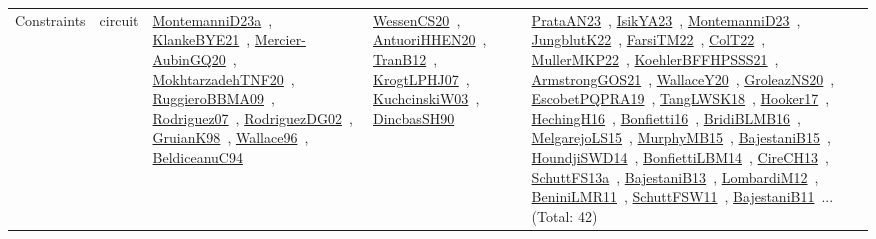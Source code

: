 {\begin{longtable}{lp{3cm}>{\raggedright\arraybackslash}p{6cm}>{\raggedright\arraybackslash}p{6cm}>{\raggedright\arraybackslash}p{8cm}}
Constraints & circuit & \href{works/MontemanniD23a.pdf}{MontemanniD23a}~\cite{MontemanniD23a}, \href{works/KlankeBYE21.pdf}{KlankeBYE21}~\cite{KlankeBYE21}, \href{works/Mercier-AubinGQ20.pdf}{Mercier-AubinGQ20}~\cite{Mercier-AubinGQ20}, \href{works/MokhtarzadehTNF20.pdf}{MokhtarzadehTNF20}~\cite{MokhtarzadehTNF20}, \href{works/RuggieroBBMA09.pdf}{RuggieroBBMA09}~\cite{RuggieroBBMA09}, \href{works/Rodriguez07.pdf}{Rodriguez07}~\cite{Rodriguez07}, \href{works/RodriguezDG02.pdf}{RodriguezDG02}~\cite{RodriguezDG02}, \href{works/GruianK98.pdf}{GruianK98}~\cite{GruianK98}, \href{works/Wallace96.pdf}{Wallace96}~\cite{Wallace96}, \href{works/BeldiceanuC94.pdf}{BeldiceanuC94}~\cite{BeldiceanuC94} & \href{works/WessenCS20.pdf}{WessenCS20}~\cite{WessenCS20}, \href{works/AntuoriHHEN20.pdf}{AntuoriHHEN20}~\cite{AntuoriHHEN20}, \href{works/TranB12.pdf}{TranB12}~\cite{TranB12}, \href{works/KrogtLPHJ07.pdf}{KrogtLPHJ07}~\cite{KrogtLPHJ07}, \href{works/KuchcinskiW03.pdf}{KuchcinskiW03}~\cite{KuchcinskiW03}, \href{works/DincbasSH90.pdf}{DincbasSH90}~\cite{DincbasSH90} & \href{works/PrataAN23.pdf}{PrataAN23}~\cite{PrataAN23}, \href{works/IsikYA23.pdf}{IsikYA23}~\cite{IsikYA23}, \href{works/MontemanniD23.pdf}{MontemanniD23}~\cite{MontemanniD23}, \href{works/JungblutK22.pdf}{JungblutK22}~\cite{JungblutK22}, \href{works/FarsiTM22.pdf}{FarsiTM22}~\cite{FarsiTM22}, \href{works/ColT22.pdf}{ColT22}~\cite{ColT22}, \href{works/MullerMKP22.pdf}{MullerMKP22}~\cite{MullerMKP22}, \href{works/KoehlerBFFHPSSS21.pdf}{KoehlerBFFHPSSS21}~\cite{KoehlerBFFHPSSS21}, \href{works/ArmstrongGOS21.pdf}{ArmstrongGOS21}~\cite{ArmstrongGOS21}, \href{works/WallaceY20.pdf}{WallaceY20}~\cite{WallaceY20}, \href{works/GroleazNS20.pdf}{GroleazNS20}~\cite{GroleazNS20}, \href{works/EscobetPQPRA19.pdf}{EscobetPQPRA19}~\cite{EscobetPQPRA19}, \href{works/TangLWSK18.pdf}{TangLWSK18}~\cite{TangLWSK18}, \href{works/Hooker17.pdf}{Hooker17}~\cite{Hooker17}, \href{works/HechingH16.pdf}{HechingH16}~\cite{HechingH16}, \href{works/Bonfietti16.pdf}{Bonfietti16}~\cite{Bonfietti16}, \href{works/BridiBLMB16.pdf}{BridiBLMB16}~\cite{BridiBLMB16}, \href{works/MelgarejoLS15.pdf}{MelgarejoLS15}~\cite{MelgarejoLS15}, \href{works/MurphyMB15.pdf}{MurphyMB15}~\cite{MurphyMB15}, \href{works/BajestaniB15.pdf}{BajestaniB15}~\cite{BajestaniB15}, \href{works/HoundjiSWD14.pdf}{HoundjiSWD14}~\cite{HoundjiSWD14}, \href{works/BonfiettiLBM14.pdf}{BonfiettiLBM14}~\cite{BonfiettiLBM14}, \href{works/CireCH13.pdf}{CireCH13}~\cite{CireCH13}, \href{works/SchuttFS13a.pdf}{SchuttFS13a}~\cite{SchuttFS13a}, \href{works/BajestaniB13.pdf}{BajestaniB13}~\cite{BajestaniB13}, \href{works/LombardiM12.pdf}{LombardiM12}~\cite{LombardiM12}, \href{works/BeniniLMR11.pdf}{BeniniLMR11}~\cite{BeniniLMR11}, \href{works/SchuttFSW11.pdf}{SchuttFSW11}~\cite{SchuttFSW11}, \href{works/BajestaniB11.pdf}{BajestaniB11}~\cite{BajestaniB11}... (Total: 42)\\

\end{longtable}}
